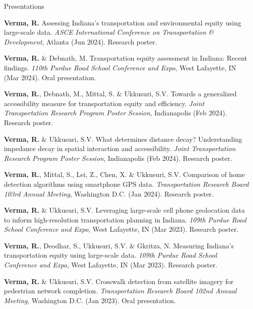 \documentclass{CV} %
\begin{document}
\begin{rSection}{Presentations}
    \begin{etaremune}
        \item \textbf{Verma, R.} Assessing Indiana's transportation and environmental equity using large-scale data. \textit{ASCE International Conference on Transportation \& Development}, Atlanta (Jun 2024). Research poster.

        \item \textbf{Verma, R.} \& Debnath, M. Transportation equity assessment in Indiana: Recent findings. \textit{110th Purdue Road School Conference and Expo}, West Lafayette, IN (Mar 2024). Oral presentation.
        
        \item \textbf{Verma, R.}, Debnath, M., Mittal, S. \& Ukkusuri, S.V. Towards a generalized accessibility measure for transportation equity and efficiency. \textit{Joint Transportation Research Program Poster Session}, Indianapolis (Feb 2024). Research poster.
        
        \item \textbf{Verma, R.} \& Ukkusuri, S.V. What determines distance decay? Understanding impedance decay in spatial interaction and accessibility. \textit{Joint Transportation Research Program Poster Session}, Indianapolis (Feb 2024). Research poster.

        \item \textbf{Verma, R.}, Mittal, S., Lei, Z., Chen, X. \& Ukkusuri, S.V. Comparison of home detection algorithms using smartphone GPS data. \textit{Transportation Research Board 103rd Annual Meeting}, Washington D.C. (Jan 2024). Research poster.

        \item \textbf{Verma, R.} \& Ukkusuri, S.V. Leveraging large-scale cell phone geolocation data to inform high-resolution transportation planning in Indiana. \textit{109th Purdue Road School Conference and Expo}, West Lafayette, IN (Mar 2023). Research poster.

        \item \textbf{Verma, R.}, Deodhar, S., Ukkusuri, S.V. \& Gkritza, N. Measuring Indiana's transportation equity using large-scale data. \textit{109th Purdue Road School Conference and Expo}, West Lafayette, IN (Mar 2023). Research poster.

        \item \textbf{Verma, R.} \& Ukkusuri, S.V. Crosswalk detection from satellite imagery for pedestrian network completion. \textit{Transportation Research Board 102nd Annual Meeting}, Washington D.C. (Jan 2023). Oral presentation.


\end{etaremune}
\end{rSection}
\end{document}
